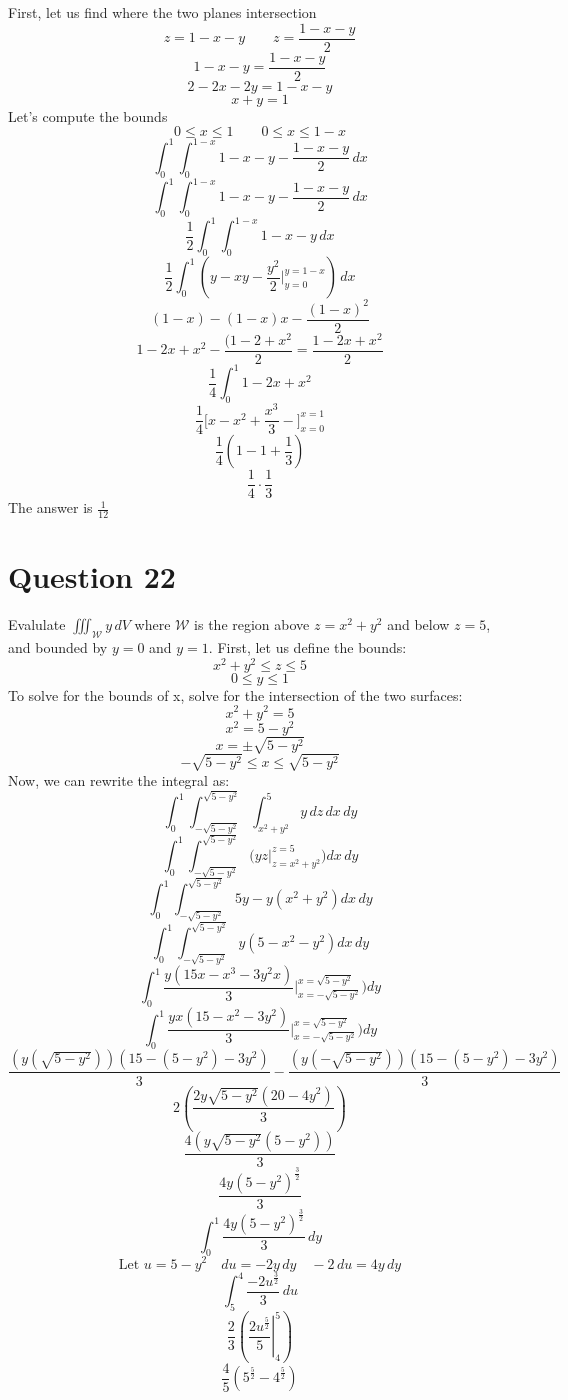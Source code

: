 \documentclass[hidelinks]{article}
\begin{document}
First, let us find where the two planes intersection
\[
    z = 1 - x - y \quad \quad z = \frac{1-x-y}{2}
\]
\[
    1-x-y = \frac{1-x-y}{2}
\]
\[
    2-2x-2y = 1-x-y
\]
\[
    x+y =1
\]
Let's compute the bounds
\[
0 \leq x \leq 1 \quad \quad 0 \leq x \leq 1-x 
\]
\[
    \int_{0}^1 \int_{0}^{1-x} 1-x-y -\frac{1-x-y}{2} \, dx
\]
\[
    \int_{0}^1 \int_{0}^{1-x} 1-x-y -\frac{1-x-y}{2} \, dx
\]
\[
    \frac{1}{2}\int_{0}^1 \int_{0}^{1-x}1-x-y \, dx
\]
\[
    \frac{1}{2}\int_{0}^1\left( y-xy-\frac{y^2}{2} \Big |_{y=0}^{y =1-x}\right)\, dx
\]
\[
    (1-x) - (1-x)x - \frac{(1-x)^2}{2}
\]
\[
    1-2x+x^2 -  \frac{(1-2+x^2}{2} = \frac{1-2x+x^2}{2} 
\]
\[
    \frac{1}{4} \int_0^1 1-2x+x^2
\]
\[
    \frac{1}{4} \Big [ x - x^2 + \frac{x^3}{3} -\Big]_{x=0}^{x=1}
\]
\[
    \frac{1}{4} (1 - 1 + \frac{1}{3})
\]
\[
    \frac{1}{4} \cdot \frac{1}{3}
\]
The answer is $\frac{1}{12}$
\newpage
\section{Question 22}
Evalulate $\iiint_{\mathcal{W}} y \, dV$ where $\mathcal{W}$ is the region above $z = x^2 + y^2$ and below $z = 5$, and bounded by $y = 0$ and $y = 1$. 
First, let us define the bounds:
\[
    x^2 + y^2 \leq z \leq 5
\]
\[
    0 \leq y \leq 1
\]
To solve for the bounds of x, solve for the intersection of the two surfaces:
\[
    x^2 + y^2 = 5
\]
\[
    x^2 = 5 - y^2
\]
\[
    x = \pm \sqrt{5 - y^2}
\]
\[
    -\sqrt{5-y^2} \leq x \leq \sqrt{5-y^2}
\]
Now, we can rewrite the integral as:
\[
    \int_{0}^{1} \int_{-\sqrt{5-y^2}}^{\sqrt{5-y^2}} \int_{x^2 + y^2}^{5} y \, dz \, dx \, dy
\]
\[ 
    \int_{0}^{1} \int_{-\sqrt{5-y^2}}^{\sqrt{5-y^2}} \Big ( yz \Big |_{z = x^2 + y^2}^{z = 5} \Big ) dx \, dy
\]
\[ 
    \int_{0}^{1} \int_{-\sqrt{5-y^2}}^{\sqrt{5-y^2}} 5y - y(x^2 + y^2) dx \, dy
\]
\[ 
    \int_{0}^{1} \int_{-\sqrt{5-y^2}}^{\sqrt{5-y^2}} y(5 - x^2 - y^2) dx \, dy
\]
\[
    \int_{0}^{1} \frac{y(15x - x^3 - 3y^2x)}{3} \Big |_{x = -\sqrt{5-y^2}}^{x = \sqrt{5-y^2}} \Big) dy
\]
\[
    \int_{0}^{1} \frac{yx(15 - x^2 - 3y^2)}{3} \Big |_{x = -\sqrt{5-y^2}}^{x = \sqrt{5-y^2}} \Big) dy
\]
\[
    \frac{(y(\sqrt{5-y^2}))(15-(5-y^2)-3y^2)}{3} -
    \frac{(y(-\sqrt{5-y^2}))(15-(5-y^2)-3y^2)}{3}  
\]
\[
    2(\frac{2y\sqrt{5-y^2}(20 - 4y^2)}{3})
\]
\[
    \frac{4(y\sqrt{5-y^2}(5 -y^2))}{3}
\]
\[
    \frac{4y(5-y^2)^\frac{3}{2}}{3}
\]
\[
    \int_{0}^{1}\frac{4y(5-y^2)^\frac{3}{2}}{3}\, dy
\]
\[
    \text{Let $u = 5 - y^2$} \quad du = -2y \,dy \quad -2\,du = 4y\,dy 
\]
\[
    \int_{5}^4 \frac{-2u^\frac{3}{2}}{3} \, du 
\]
\[
    \frac{2}{3} \left( \left . \frac{2u^{\frac{5}{2}}}{5}\right |_4^5\right)
\]
\[
    \frac{4}{5} (5^{\frac{5}{2}} - 4^{\frac{5}{2}})
\]
\end{document}
